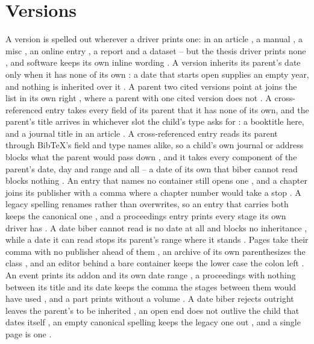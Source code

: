 \documentclass[acmsmall,nonacm,natbib=false]{acmart}
\begin{document}
\thispagestyle{empty}

\section*{Versions}
A version is spelled out wherever a driver prints one: in an article \cite{VerArticle}, a manual \cite{VerManual}, a misc \cite{VerMisc}, an online entry \cite{VerOnline}, a report \cite{VerReport} and a dataset \cite{VerDataset} -- but the thesis driver prints none \cite{VerThesis}, and software keeps its own inline wording \cite{NdSoftware}.
A version inherits its parent's date only when it has none of its own \cite{SwPlainChild}: a date that starts open supplies an empty year, and nothing is inherited over it \cite{SwOpenChild}.
A parent two cited versions point at joins the list in its own right \cite{SwOpenChild,SwPlainChild}, where a parent with one cited version does not \cite{SwLoneChild}.
A cross-referenced entry takes every field of its parent that it has none of its own, and the parent's title arrives in whichever slot the child's type asks for \cite{IhFirst,IhSecond}: a booktitle here, and a journal title in an article \cite{IhArticle}.
A cross-referenced entry reads its parent through BibTeX's field and type names alike, so a child's own journal or address blocks what the parent would pass down \cite{AlKid,AlConf}, and it takes every component of the parent's date, day and range and all \cite{DcKid} -- a date of its own that biber cannot read blocks nothing \cite{DrKid}.
An entry that names no container still opens one \cite{SoloIn}, and a chapter joins its publisher with a comma where a chapter number would take a stop \cite{PgBook}.
A legacy spelling renames rather than overwrites, so an entry that carries both keeps the canonical one \cite{TwoSpellings}, and a proceedings entry prints every stage its own driver has \cite{FullProc}.
A date biber cannot read is no date at all and blocks no inheritance \cite{BogusKid}, while a date it can read stops its parent's range where it stands \cite{ChainKid}.
Pages take their comma with no publisher ahead of them \cite{NoPubPages}, an archive of its own parenthesizes the class \cite{CustomEprint}, and an editor behind a bare container keeps the lower case the colon left \cite{NoBookEditor}.
An event prints its addon and its own date range \cite{EvFull}, a proceedings with nothing between its title and its date keeps the comma the stages between them would have used \cite{PrMin,PrSer}, and a part prints without a volume \cite{PtOnly}.
A date biber rejects outright leaves the parent's to be inherited \cite{DtM13}, an open end does not outlive the child that dates itself \cite{OpKid}, an empty canonical spelling keeps the legacy one out \cite{EmCanon}, and a single page is one \cite{PgOne}.
\end{document}
